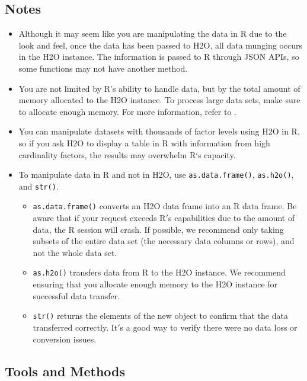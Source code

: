\subsection{Notes}
\begin{itemize}

\item Although it may seem like you are manipulating the data in R due to the look and feel, once the data has been passed to H2O, all data munging occurs in the H2O instance. The information is passed to R through JSON APIs, so some functions may not have another method. 
\item You are not limited by R's ability to handle data, but by the total amount of memory allocated to the H2O instance. To process large data sets, make sure to allocate enough memory. For more information, refer to . 
\item You can manipulate datasets with thousands of factor levels using H2O in R, so if you ask H2O to display a table in R with information from high cardinality factors, the results may overwhelm R`s capacity. 
\item To manipulate data in R and not in H2O, use {\texttt{as.data.frame()}}, {\texttt{as.h2o()}}, and {\texttt{str()}}. \begin{itemize}
\item {\texttt{as.data.frame()}} converts an H2O data frame into an R data frame. Be aware that if your request exceeds R$'$s capabilities due to the amount of data, the R session will crash. If possible, we recommend only taking subsets of the entire data set (the necessary data columns or rows), and not the whole data set. 
\item {\texttt{as.h2o()}} transfers data from R to the H2O instance. We recommend ensuring that you allocate enough memory to the H2O instance for successful data transfer.
\item {\texttt{str()}} returns the elements of the new object to confirm that the data transferred correctly. It$'$s a good way to verify there were no data loss or conversion issues. %
\end{itemize}
\end{itemize}

\subsection{Tools and Methods}

